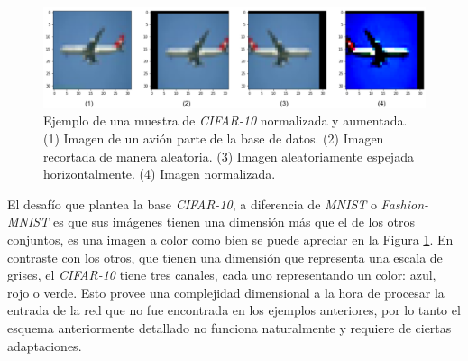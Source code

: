 \documentclass[spanish]{article}
\theoremstyle{definition}
\theoremstyle{remark}
\numberwithin{equation}{section}
\numberwithin{equation}{section} %
\begin{document}
\begin{figure}[H]
\centering
\includegraphics[width=14cm]{img/ejemplo_cifar_normalizado_aumentado.png}
\caption[Ejemplo de una muestra de \textit{CIFAR-10} normalizada y aumentada]{\footnotesize{  Ejemplo de una muestra de \textit{CIFAR-10} normalizada y aumentada. (1) Imagen de un avión parte de la base de datos. (2) Imagen recortada de manera aleatoria. (3) Imagen aleatoriamente espejada horizontalmente. (4) Imagen normalizada.   }}
\label{fig:normalized_cifar}
\end{figure}
El desafío que plantea la base \textit{CIFAR-10}, a diferencia de \textit{MNIST} o \textit{Fashion-MNIST} es que sus imágenes tienen una dimensión más que el de los otros conjuntos, es una imagen a color como bien se puede apreciar en la Figura \ref{fig:normalized_cifar}. En contraste con los otros, que tienen una dimensión que representa una escala de grises, el \textit{CIFAR-10} tiene tres canales, cada uno representando un color: azul, rojo o verde. Esto provee una complejidad dimensional a la hora de procesar la entrada de la red que no fue encontrada en los ejemplos anteriores, por lo tanto el esquema anteriormente detallado no funciona naturalmente y requiere de ciertas adaptaciones. 
\par
\end{document}

